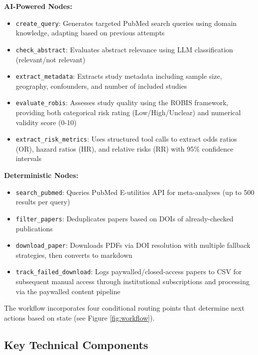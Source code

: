 \documentclass[12pt]{article}
\begin{document}
\vspace{1em}

\textbf{AI-Powered Nodes:}
\begin{itemize}
    \item \texttt{create\_query}: Generates targeted PubMed search queries using domain knowledge, adapting based on previous attempts
    \item \texttt{check\_abstract}: Evaluates abstract relevance using LLM classification (relevant/not relevant)
    \item \texttt{extract\_metadata}: Extracts study metadata including sample size, geography, confounders, and number of included studies
    \item \texttt{evaluate\_robis}: Assesses study quality using the ROBIS framework, providing both categorical risk rating (Low/High/Unclear) and numerical validity score (0-10)
    \item \texttt{extract\_risk\_metrics}: Uses structured tool calls to extract odds ratios (OR), hazard ratios (HR), and relative risks (RR) with 95\% confidence intervals
\end{itemize}


\vspace{1em}



\textbf{Deterministic Nodes:}
\begin{itemize}
    \item \texttt{search\_pubmed}: Queries PubMed E-utilities API for meta-analyses (up to 500 results per query)
    \item \texttt{filter\_papers}: Deduplicates papers based on DOIs of already-checked publications
    \item \texttt{download\_paper}: Downloads PDFs via DOI resolution with multiple fallback strategies, then converts to markdown
    \item \texttt{track\_failed\_download}: Logs paywalled/closed-access papers to CSV for subsequent manual access through institutional subscriptions and processing via the paywalled content pipeline
\end{itemize}

The workflow incorporates four conditional routing points that determine next actions based on state (see Figure \ref{fig:workflow}).

\subsection{Key Technical Components}
\vspace{1em}
\end{document}
